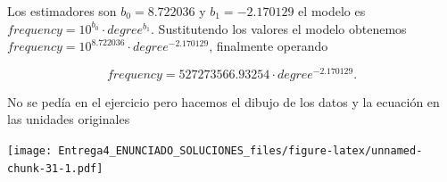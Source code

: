\documentclass[
]{article}
\newenvironment{Shaded}{\begin{snugshade}}{\end{snugshade}}
\newcommand{\ControlFlowTok}[1]{\textcolor[rgb]{0.13,0.29,0.53}{\textbf{#1}}}
\newcommand{\DataTypeTok}[1]{\textcolor[rgb]{0.13,0.29,0.53}{#1}}
\newcommand{\DecValTok}[1]{\textcolor[rgb]{0.00,0.00,0.81}{#1}}
\newcommand{\FloatTok}[1]{\textcolor[rgb]{0.00,0.00,0.81}{#1}}
\newcommand{\KeywordTok}[1]{\textcolor[rgb]{0.13,0.29,0.53}{\textbf{#1}}}
\newcommand{\NormalTok}[1]{#1}
\newcommand{\OperatorTok}[1]{\textcolor[rgb]{0.81,0.36,0.00}{\textbf{#1}}}
\newcommand{\OtherTok}[1]{\textcolor[rgb]{0.56,0.35,0.01}{#1}}
\newcommand{\StringTok}[1]{\textcolor[rgb]{0.31,0.60,0.02}{#1}}
\begin{document}
Los estimadores son \(b_0=8.722036\) y \(b_1=-2.170129\) el modelo es
\(frequency=10^{b_0}\cdot degree^{b_1}\). Sustitutendo los valores el
modelo obtenemos \(frequency=10^{8.722036}\cdot degree^{-2.170129}\),
finalmente operando

\[frequency=527273566.93254\cdot degree^{-2.170129}.\]

No se pedía en el ejercicio pero hacemos el dibujo de los datos y la
ecuación en las unidades originales

\begin{Shaded}
\end{Shaded}

\texttt{[image: Entrega4\_ENUNCIADO\_SOLUCIONES\_files/figure-latex/unnamed-chunk-31-1.pdf]}
\end{document}
